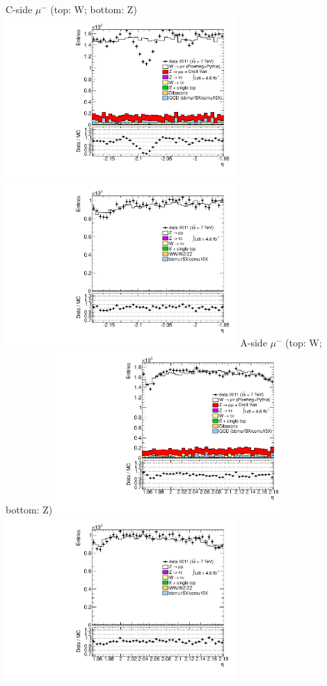  {
\colb[T]
C-side $\mu^{-}$ (top: W; bottom: Z)
\centering
\includegraphics[width=0.66\textwidth]{dates/20130306/figures/etaphi/WpMtoM_10_C_stack_l_eta_NEG} \\
\includegraphics[width=0.66\textwidth]{dates/20130306/figures/etaphi/Z_10_C_stack_lN_eta_ALL.pdf}
A-side $\mu^{-}$ (top: W; bottom: Z)
\centering
\includegraphics[width=0.66\textwidth]{dates/20130306/figures/etaphi/WpMtoM_10_A_stack_l_eta_NEG} \\
\includegraphics[width=0.66\textwidth]{dates/20130306/figures/etaphi/Z_10_A_stack_lN_eta_ALL.pdf} 
\cole
}

